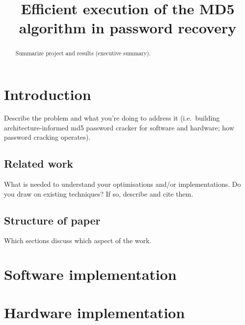 


\title{Efficient execution of the MD5 algorithm in password recovery }

\author{
}

\maketitle


\begin{abstract}
Summarize project and results (executive summary).
\end{abstract}

\section{Introduction}
Describe the problem and what you're doing to address it (i.e.\ building architecture-informed md5 password cracker for software and hardware; how password cracking operates).  

\subsection{Related work}
What is needed to understand your optimisations and/or implementations.  Do you draw on existing techniques? If so, describe and cite them.

\subsection{Structure of paper}
Which sections discuss which aspect of the work.

\section{Software implementation}



\section{Hardware implementation}

%

